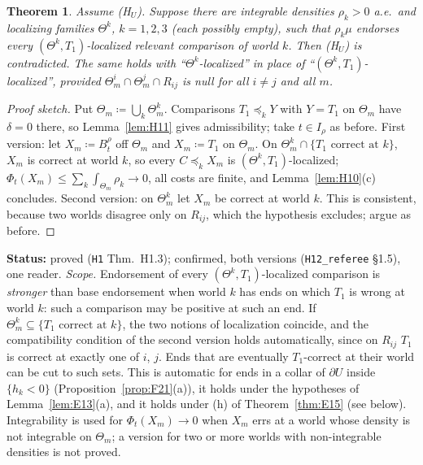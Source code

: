 \documentclass[11pt]{article}
\newtheorem{theorem}{Theorem}[section]
\theoremstyle{definition}
\theoremstyle{remark}
\newcommand{\src}[1]{\texttt{#1}}
\newcommand{\status}[1]{\par\smallskip\noindent\textbf{Status:} #1\par\smallskip}
\begin{document}
\begin{theorem}\label{thm:H13}
Assume (H$_U$). Suppose there are integrable densities $\rho_k>0$ a.e.\ and localizing families $\Theta^k$, $k=1,2,3$ (each possibly empty), such that $\rho_k\mu$ endorses every $(\Theta^k,T_1)$-localized relevant comparison of world $k$. Then (H$_U$) is contradicted. The same holds with ``$\Theta^k$-localized'' in place of ``$(\Theta^k,T_1)$-localized'', provided $\Theta^i_m\cap\Theta^j_m\cap R_{ij}$ is null for all $i\ne j$ and all $m$.
\end{theorem}
\begin{proof}[Proof sketch]
Put $\Theta_m\coloneqq\bigcup_k\Theta^k_m$. Comparisons $T_1\preceq_kY$ with $Y=T_1$ on $\Theta_m$ have $\delta=0$ there, so Lemma~\ref{lem:H11} gives admissibility; take $t\in I_\rho$ as before. First version: let $X_m\coloneqq B^\rho_t$ off $\Theta_m$ and $X_m\coloneqq T_1$ on $\Theta_m$. On $\Theta^k_m\cap\{T_1\text{ correct at }k\}$, $X_m$ is correct at world $k$, so every $C\preceq_kX_m$ is $(\Theta^k,T_1)$-localized; $\Phi_t(X_m)\le\sum_k\int_{\Theta_m}\rho_k\to0$, all costs are finite, and Lemma~\ref{lem:H10}(c) concludes. Second version: on $\Theta^k_m$ let $X_m$ be correct at world $k$. This is consistent, because two worlds disagree only on $R_{ij}$, which the hypothesis excludes; argue as before.
\end{proof}
\status{proved (\src{H1} Thm.~H1.3); confirmed, both versions (\src{H12\_referee} \S1.5), one reader. \emph{Scope.} Endorsement of every $(\Theta^k,T_1)$-localized comparison is \emph{stronger} than base endorsement when world $k$ has ends on which $T_1$ is wrong at world $k$: such a comparison may be positive at such an end. If $\Theta^k_m\subseteq\{T_1\text{ correct at }k\}$, the two notions of localization coincide, and the compatibility condition of the second version holds automatically, since on $R_{ij}$ $T_1$ is correct at exactly one of $i$, $j$. Ends that are eventually $T_1$-correct at their world can be cut to such sets. This is automatic for ends in a collar of $\partial U$ inside $\{h_k<0\}$ (Proposition~\ref{prop:F21}(a)), it holds under the hypotheses of Lemma~\ref{lem:E13}(a), and it holds under (h) of Theorem~\ref{thm:E15} (see below). Integrability is used for $\Phi_t(X_m)\to0$ when $X_m$ errs at a world whose density is not integrable on $\Theta_m$; a version for two or more worlds with non-integrable densities is not proved.}
\end{document}
